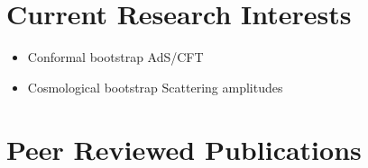 \documentclass[a4paper,11pt]{article}
\begin{document}
\section{\textcolor{burntorange}{Current Research Interests}}
\begin{itemize}[noitemsep,nolistsep] 
	\item[] Conformal bootstrap\hspace*{13.2em} AdS/CFT
	\item[] Cosmological bootstrap\hspace*{12em} Scattering amplitudes
\end{itemize}

 \section{\textcolor{burntorange}{Peer Reviewed Publications}}
\end{document}
